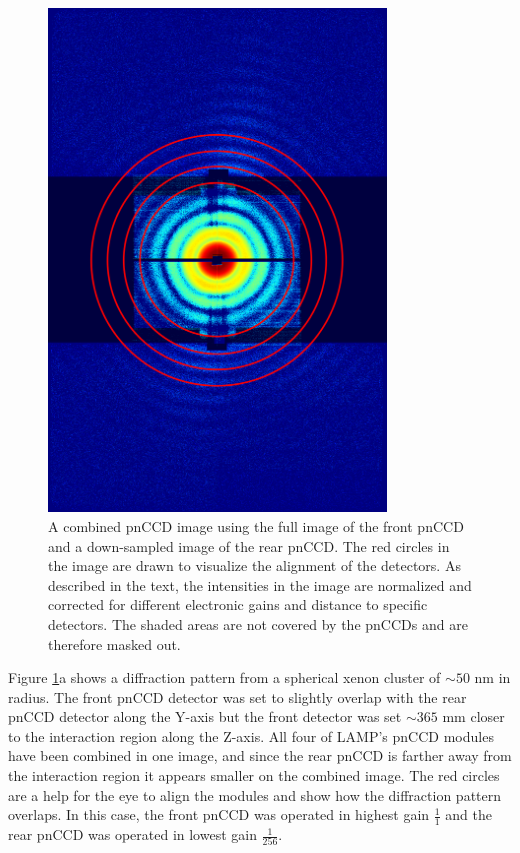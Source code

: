 %
%
%
\begin{figure}
	\centering
		\includegraphics[width=0.8\textwidth]{images/pnCCD-image-geometry.png}
	\caption[Front and rear pnCCD arranged to combine measured diffraction image.]{A combined pnCCD image using the full image of the front pnCCD and a down-sampled image of the rear pnCCD. The red circles in the image are drawn to visualize the alignment of the detectors. As described in the text, the intensities in the image are normalized and corrected for different electronic gains and distance to specific detectors. The shaded areas are not covered by the pnCCDs and are therefore masked out.}
	\label{fig:pnCCD-image-aligned}
\end{figure}
Figure \ref{fig:pnCCD-image-aligned}a shows a diffraction pattern from a spherical xenon cluster of $\sim 50$ nm in radius. The front pnCCD detector was set to slightly overlap with the rear pnCCD detector along the Y-axis but the front detector was set $\sim 365$ mm closer to the interaction region along the Z-axis. All four of LAMP's pnCCD modules have been combined in one image, and since the rear pnCCD is farther away from the interaction region it appears smaller on the combined image. The red circles are a help for the eye to align the modules and show how the diffraction pattern overlaps. In this case, the front pnCCD was operated in highest gain $\frac{1}{1}$ and the rear pnCCD was operated in lowest gain $\frac{1}{256}$.\\[1\baselineskip]
